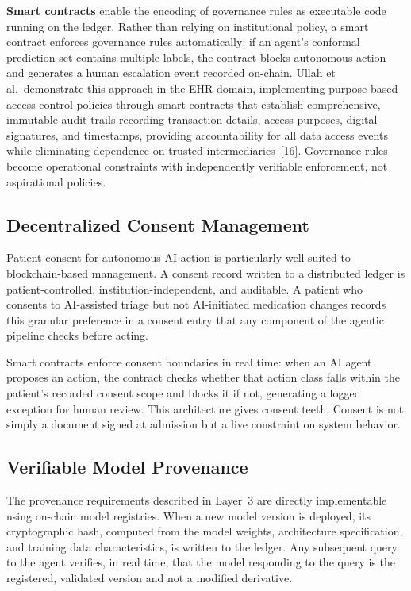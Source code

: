 \documentclass[11pt]{article}
\begin{document}
\textbf{Smart contracts} enable the encoding of governance rules as
executable code running on the ledger. Rather than relying on
institutional policy, a smart contract enforces governance rules
automatically: if an agent's conformal prediction set contains multiple
labels, the contract blocks autonomous action and generates a human
escalation event recorded on-chain. Ullah et al.~demonstrate this
approach in the EHR domain, implementing purpose-based access control
policies through smart contracts that establish comprehensive, immutable
audit trails recording transaction details, access purposes, digital
signatures, and timestamps, providing accountability for all data access
events while eliminating dependence on trusted intermediaries~{[}16{]}.
Governance rules become operational constraints with independently
verifiable enforcement, not aspirational policies.

\subsection{Decentralized Consent
Management}\label{decentralized-consent-management}

Patient consent for autonomous AI action is particularly well-suited to
blockchain-based management. A consent record written to a distributed
ledger is patient-controlled, institution-independent, and auditable. A
patient who consents to AI-assisted triage but not AI-initiated
medication changes records this granular preference in a consent entry
that any component of the agentic pipeline checks before acting.

Smart contracts enforce consent boundaries in real time: when an AI
agent proposes an action, the contract checks whether that action class
falls within the patient's recorded consent scope and blocks it if not,
generating a logged exception for human review. This architecture gives
consent teeth. Consent is not simply a document signed at admission but
a live constraint on system behavior.

\subsection{Verifiable Model
Provenance}\label{verifiable-model-provenance}

The provenance requirements described in Layer~3 are directly
implementable using on-chain model registries. When a new model version
is deployed, its cryptographic hash, computed from the model weights,
architecture specification, and training data characteristics, is
written to the ledger. Any subsequent query to the agent verifies, in
real time, that the model responding to the query is the registered,
validated version and not a modified derivative.
\end{document}
